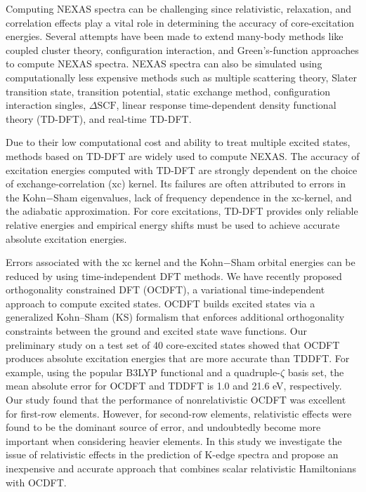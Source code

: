 \documentclass{article}
\begin{document}
Computing NEXAS spectra can be challenging since relativistic, relaxation, and correlation effects play a vital role in determining the accuracy of core-excitation energies. Several attempts have been made to extend many-body methods like coupled cluster theory\cite{LR-CC-core,Bartlett-EOM-core,Besley-EOM-MOM,Li-EOM,MRCC-core1, MRCC-core2, MRCC-core3}, configuration interaction\cite{CI_core,CI_core1,Nesse-CI,Asmuruf2008267,Grimme1996128}, and Green's-function approaches\cite{ADC2,Bethe-Salpeter} to compute NEXAS spectra.
NEXAS spectra can also be simulated using computationally less expensive methods such as multiple scattering theory\cite{Rehr-MS,MS-another,PhysRevB.63.125120}, Slater transition state\cite{sTOM}, transition potential\cite{TPT,PhysRevLett.96.215502}, static exchange method\cite{STEX}, configuration interaction singles\cite{SAC-CIS, SAC-CIS-2}, $\Delta \text{SCF}$\cite{Delta-SCF}, linear response time-dependent density functional theory (TD-DFT)\cite{TD-DFT-core,Besley-tddft, TD-DFT-Li}, and real-time TD-DFT\cite{RT-DFT-nwchem,Lopata-recent}.

Due to their low computational cost and ability to treat multiple excited states, methods based on TD-DFT are widely used to compute NEXAS. The accuracy of excitation energies computed with TD-DFT are strongly dependent on the choice of exchange-correlation (xc) kernel. Its failures are often attributed to errors in the Kohn$-$Sham eigenvalues, lack of frequency dependence in  the xc-kernel, and the adiabatic approximation\cite{Casida-review-2012}. For core excitations, TD-DFT provides only reliable relative energies\cite{Besley-Gill} and empirical energy shifts must be used to achieve accurate absolute excitation energies.

Errors associated with the xc kernel and the Kohn$-$Sham orbital energies\cite{DFT_PV_3,DFT_PV_4} can be reduced by using time-independent DFT methods\cite{Besley-Gill,Voorhis,Ziegler-1}. 
We have recently proposed orthogonality constrained DFT (OCDFT),\cite{OCDFT} a variational time-independent approach to compute excited states.
OCDFT builds excited states via a generalized Kohn--Sham (KS) formalism that enforces additional orthogonality constraints between the ground and excited state wave functions.
Our preliminary study\cite{Wallace-OCDFT} on a test set of 40 core-excited states showed that OCDFT produces absolute excitation energies that are more accurate than TDDFT.
For example, using the popular B3LYP functional and a quadruple-$\zeta$ basis set, the mean absolute error for OCDFT and TDDFT is 1.0 and 21.6 eV, respectively. 
Our study found that the performance of nonrelativistic OCDFT was excellent for first-row elements.
However, for second-row elements, relativistic effects were found to be the dominant source of error, and undoubtedly become more important when considering heavier elements. In this study we investigate the issue of relativistic effects in the prediction of K-edge spectra and propose an inexpensive and accurate approach that combines scalar relativistic Hamiltonians with OCDFT.
\end{document}
